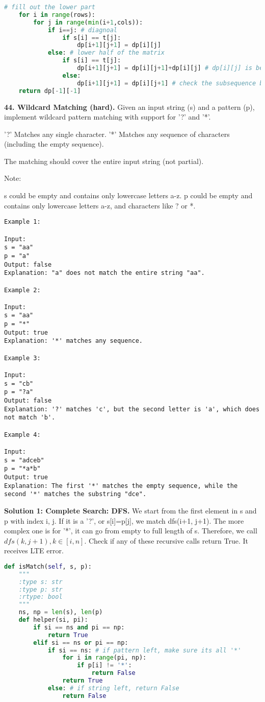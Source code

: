 \documentclass[../main.tex]{subfiles}
\begin{document}
\begin{examples}[resume]
\begin{lstlisting}[language=Python]
    # fill out the lower part
    for i in range(rows):
        for j in range(min(i+1,cols)):
            if i==j: # diagnoal
                if s[i] == t[j]:
                    dp[i+1][j+1] = dp[i][j] 
            else: # lower half of the matrix 
                if s[i] == t[j]:
                    dp[i+1][j+1] = dp[i][j+1]+dp[i][j] # dp[i][j] is because they equal, so check previous i,j, 
                else:
                    dp[i+1][j+1] = dp[i][j+1] # check the subsequence before this char in S is the same as t 
    return dp[-1][-1]
\end{lstlisting}
\item \textbf{44. Wildcard Matching (hard).} Given an input string (s) and a pattern (p), implement wildcard pattern matching with support for '?' and '*'.

'?' Matches any single character.
'*' Matches any sequence of characters (including the empty sequence).

The matching should cover the entire input string (not partial).

Note:

    s could be empty and contains only lowercase letters a-z.
    p could be empty and contains only lowercase letters a-z, and characters like ? or *.
\begin{lstlisting}[numbers=none]
Example 1:

Input:
s = "aa"
p = "a"
Output: false
Explanation: "a" does not match the entire string "aa".

Example 2:

Input:
s = "aa"
p = "*"
Output: true
Explanation: '*' matches any sequence.

Example 3:

Input:
s = "cb"
p = "?a"
Output: false
Explanation: '?' matches 'c', but the second letter is 'a', which does not match 'b'.

Example 4:

Input:
s = "adceb"
p = "*a*b"
Output: true
Explanation: The first '*' matches the empty sequence, while the second '*' matches the substring "dce".
\end{lstlisting}

\textbf{Solution 1: Complete Search: DFS.} We start from the first element in s and p with index i, j.  If it is a '?', or s[i]=p[j], we match dfs(i+1, j+1). The more complex one is for '*', it can go from empty to full length of s. Therefore, we call $dfs(k, j+1), k \in [i, n]$. Check if any of these recursive calls return True. It receives LTE error.
\begin{lstlisting}[language=Python]
def isMatch(self, s, p):
    """
    :type s: str
    :type p: str
    :rtype: bool
    """
    ns, np = len(s), len(p)
    def helper(si, pi):
        if si == ns and pi == np:
            return True
        elif si == ns or pi == np:
            if si == ns: # if pattern left, make sure its all '*'
                for i in range(pi, np):
                    if p[i] != '*':
                        return False
                return True
            else: # if string left, return False
                return False
        

\end{lstlisting}
\end{examples}
\end{document}
